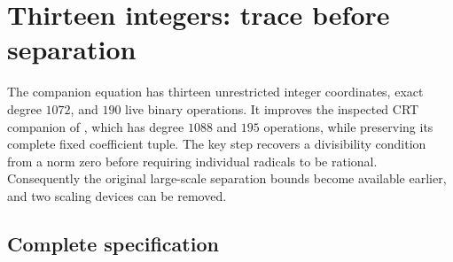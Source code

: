 \section{Thirteen integers: trace before separation}
\label{sec:trace13}

The companion equation has thirteen unrestricted integer coordinates,
exact degree $1072$, and $190$ live binary operations. It improves the
inspected CRT companion of \cite{fusion}, which has degree $1088$ and
$195$ operations, while preserving its complete fixed coefficient tuple.
The key step recovers a divisibility condition from a norm zero before
requiring individual radicals to be rational. Consequently the original
large-scale separation bounds become available earlier, and two scaling
devices can be removed.

\subsection{Complete specification}

